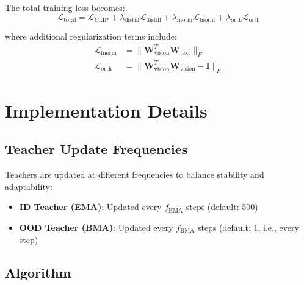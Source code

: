 \documentclass[11pt,a4paper]{article}
\begin{document}
The total training loss becomes:
\begin{equation}
\mathcal{L}_{\text{total}} = \mathcal{L}_{\text{CLIP}} + \lambda_{\text{distill}} \mathcal{L}_{\text{distill}} + \lambda_{\text{fnorm}} \mathcal{L}_{\text{fnorm}} + \lambda_{\text{orth}} \mathcal{L}_{\text{orth}}
\end{equation}

where additional regularization terms include:
\begin{align}
\mathcal{L}_{\text{fnorm}} &= \|\mathbf{W}_{\text{vision}}^T \mathbf{W}_{\text{text}}\|_F \\
\mathcal{L}_{\text{orth}} &= \|\mathbf{W}_{\text{vision}}^T \mathbf{W}_{\text{vision}} - \mathbf{I}\|_F
\end{align}

\section{Implementation Details}

\subsection{Teacher Update Frequencies}

Teachers are updated at different frequencies to balance stability and adaptability:

\begin{itemize}
\item \textbf{ID Teacher (EMA)}: Updated every $f_{\text{EMA}}$ steps (default: 500)
\item \textbf{OOD Teacher (BMA)}: Updated every $f_{\text{BMA}}$ steps (default: 1, i.e., every step)
\end{itemize}

\subsection{Algorithm}
\end{document}
